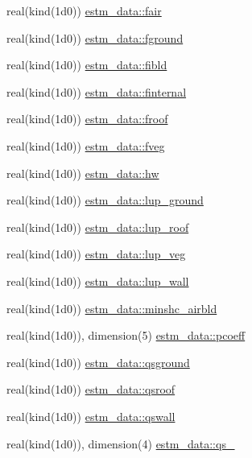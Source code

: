 \begin{DoxyCompactItemize}
\item 
real(kind(1d0)) \hyperlink{namespaceestm__data_a350989730ec91fcf195ed06a6a7c4fa7}{estm\+\_\+data\+::fair}
\item 
real(kind(1d0)) \hyperlink{namespaceestm__data_a9b01f3d94dbedc581011bbcfc3a66f5a}{estm\+\_\+data\+::fground}
\item 
real(kind(1d0)) \hyperlink{namespaceestm__data_a7d50043d64fcdfb8c7d6ad60d17cf899}{estm\+\_\+data\+::fibld}
\item 
real(kind(1d0)) \hyperlink{namespaceestm__data_ab51560756cfb7c322c529a79e60c1e41}{estm\+\_\+data\+::finternal}
\item 
real(kind(1d0)) \hyperlink{namespaceestm__data_a1fd10be127e3b3f05b97d60a4942f5b9}{estm\+\_\+data\+::froof}
\item 
real(kind(1d0)) \hyperlink{namespaceestm__data_ae5a720a9242a6d2110418f2d946a2575}{estm\+\_\+data\+::fveg}
\item 
real(kind(1d0)) \hyperlink{namespaceestm__data_ae0ab410b6628c40338fc7cea2a358363}{estm\+\_\+data\+::hw}
\item 
real(kind(1d0)) \hyperlink{namespaceestm__data_a234bc794c013bfddb122adb36d66ccce}{estm\+\_\+data\+::lup\+\_\+ground}
\item 
real(kind(1d0)) \hyperlink{namespaceestm__data_a5558ed804a2422c76b44ba02ce96305b}{estm\+\_\+data\+::lup\+\_\+roof}
\item 
real(kind(1d0)) \hyperlink{namespaceestm__data_a94b51266617e7bd1ed54b5f0be2a6041}{estm\+\_\+data\+::lup\+\_\+veg}
\item 
real(kind(1d0)) \hyperlink{namespaceestm__data_a96c7c219d9a864a8ca953f76d071846e}{estm\+\_\+data\+::lup\+\_\+wall}
\item 
real(kind(1d0)) \hyperlink{namespaceestm__data_a4376f642f063a592c13354381436ceaa}{estm\+\_\+data\+::minshc\+\_\+airbld}
\item 
real(kind(1d0)), dimension(5) \hyperlink{namespaceestm__data_a7f399d89721620a96604b14fbbceb842}{estm\+\_\+data\+::pcoeff}
\item 
real(kind(1d0)) \hyperlink{namespaceestm__data_ab1d9bb697a8d9aa36c61f312c561e7f4}{estm\+\_\+data\+::qsground}
\item 
real(kind(1d0)) \hyperlink{namespaceestm__data_aa18b673d46a2acdcdbb40997a3ddab0b}{estm\+\_\+data\+::qsroof}
\item 
real(kind(1d0)) \hyperlink{namespaceestm__data_aafce9cf85961d2bdc97dcd69019884d6}{estm\+\_\+data\+::qswall}
\item 
real(kind(1d0)), dimension(4) \hyperlink{namespaceestm__data_a6e7238f21142ff1e6b7b2482ff279191}{estm\+\_\+data\+::qs\+\_}

\end{DoxyCompactItemize}
